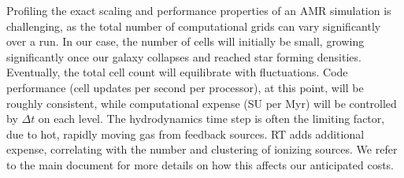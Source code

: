 \documentclass[11pt]{article}
\begin{document}

Profiling the exact scaling and performance properties of an AMR simulation is challenging, as the total number of computational grids can vary significantly over a run. In our case, the number of cells will initially be small, growing significantly once our galaxy collapses and reached star forming densities. Eventually, the total cell count will equilibrate with fluctuations. Code performance (cell updates per second per processor), at this point, will be roughly consistent, while computational expense (SU per Myr) will be controlled by $\Delta t$ on each level. The hydrodynamics time step is often the limiting factor, due to hot, rapidly moving gas from feedback sources. RT adds additional expense, correlating with the number and clustering of ionizing sources. We refer to the main document for more details on how this affects our anticipated costs.

\end{document}

